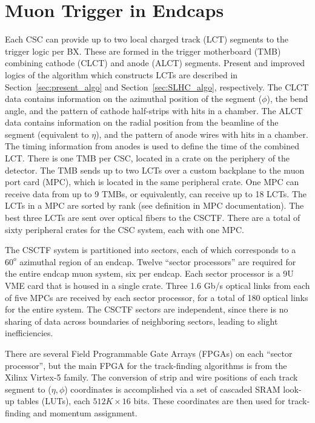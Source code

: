 \section{Muon Trigger in Endcaps}
\label{sec:endcap_trigger}

Each CSC can provide up to two local charged track (LCT) segments to the trigger logic per BX. These are formed in the trigger motherboard (TMB) combining cathode (CLCT) and anode (ALCT) segments. Present and improved logics of the algorithm which constructs LCTs are described in Section~\ref{sec:present_algo} and Section~\ref{sec:SLHC_algo}, respectively. The CLCT data contains information on the azimuthal position of the segment ($\phi$), the bend angle, and the pattern of cathode half-strips with hits in a chamber. The ALCT data contains information on the radial position from the beamline of the segment (equivalent to $\eta$), and the pattern of anode wires with hits in a chamber. The timing information from anodes is used to define the time of the combined LCT. There is one TMB per CSC, located in a crate on the periphery of the detector. The TMB sends up to two LCTs over a custom backplane to the muon port card (MPC), which is located in the same peripheral crate. One MPC can receive data from up to 9 TMBs, or equivalently, can receive up to 18 LCTs. The LCTs in a MPC are sorted by rank (see definition in MPC documentation). The best three LCTs are sent over optical fibers to the CSCTF. There are a total of sixty peripheral crates for the CSC system, each with one MPC.

The CSCTF system is partitioned into sectors, each of which corresponds to a $60^{o}$ azimuthal region of an endcap. Twelve ``sector processors'' are required for the entire endcap muon system, six per endcap. Each sector processor is a 9U VME card that is housed in a single crate. Three 1.6 Gb/s optical links from each of five MPCs are received by each sector processor, for a total of 180 optical links for the entire system. The CSCTF sectors are independent, since there is no sharing of data across boundaries of neighboring sectors, leading to slight inefficiencies.

There are several Field Programmable Gate Arrays (FPGAs) on each ``sector processor'', but the main FPGA for the track-finding algorithms is from the Xilinx Virtex-5 family. The conversion of strip and wire positions of each track segment to ($\eta, \phi$) coordinates is accomplished via a set of cascaded SRAM look-up tables (LUTs), each $512K\times16$ bits. These coordinates are then used for track-finding and momentum assignment.

